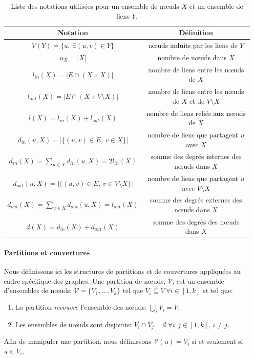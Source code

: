 \begin{table}
  \centering
    \begin{tabular}{|c|c|}
     \hline
    \rule[-1ex]{0pt}{4ex} Notation & Définition \\
  \hline
		\hline
		\rule[-1ex]{0pt}{4ex}$V(Y)=\{u,\ \exists (u,v) \in Y \}$ & n\oe uds induits par les liens de $Y$\\
		\hline
        \rule[-1ex]{0pt}{4ex}$n_X=|X|$ & nombre de n\oe uds dans $X$\\
        \hline
        \rule[-1ex]{0pt}{4ex} $l_{in}(X)=|E \cap (X \times X)|$ & nombre de liens entre les n\oe uds de $X$\\
        \hline
        \rule[-1ex]{0pt}{4ex} $l_{out}(X)=|E \cap (X \times V \setminus X)|$ & nombre de liens entre les n\oe uds de $X$ et de $V \setminus X$ \\
        \hline
        \rule[-1ex]{0pt}{4ex} $l(X)=l_{in}(X)+l_{out}(X)$ & nombre de liens reliés aux n\oe uds de $X$\\
        \hline
        \rule[-1ex]{0pt}{4ex} $d_{in}(u,X)=|\{(u,v) \in E,\ v \in X\}|$ & nombre de liens que partagent $u$ avec $X$ \\
        \hline
        \rule[-1ex]{0pt}{4ex} $d_{in}(X)=\sum_{u \in X} d_{in}(u,X)=2l_{in}(X)$ & somme des degrés internes des n\oe uds dans $X$ \\
        \hline
        \rule[-1ex]{0pt}{4ex} $d_{out}(u,X)=|\{(u,v) \in E,\ v \in V \setminus X\}|$ & nombre de liens que partagent $u$ avec $V \setminus X$ \\
        \hline
       \rule[-1ex]{0pt}{4ex}  $d_{out}(X)=\sum_{u \in X} d_{out}(u,X)=l_{out}(X)$ & somme des degrés externes des n\oe uds dans $X$ \\
        \hline
        \rule[-1ex]{0pt}{4ex}  $d(X)=d_{in}(X)+ d_{out}(X)$ & somme des degrés des n\oe uds dans $X$ \\
        \hline
    \end{tabular}
    \caption{Liste des notations utilisées pour un ensemble de n\oe uds $X$ et un ensemble de liens $Y$.}
         \label{tab:notation_groupe_noeuds}
\end{table}%


\paragraph{Partitions et couvertures}
Nous définissons ici les structures de partitions et de couvertures appliquées au cadre spécifique des graphes.
Une partition de n\oe uds, $\mathcal{V}$, est un ensemble d'ensembles de n\oe uds: $\mathcal{V}= \{V_1,..., V_k\}$ tel que $V_i \subseteq V\ \forall i \in [1,k]$ et tel que:
\begin{enumerate}
\item La partition \emph{recouvre} l'ensemble des n\oe uds: $\bigcup_{i} V_i = V$.
\item Les ensembles de n\oe uds sont disjoints: $V_i \cap V_j = \emptyset\ \forall i,j \in [1,k],\ i \neq j$.
\end{enumerate}
Afin de manipuler une partition, nous définissons $\mathcal{V}(u)=V_i$ si et seulement si $u \in V_i$.
\bigskip

